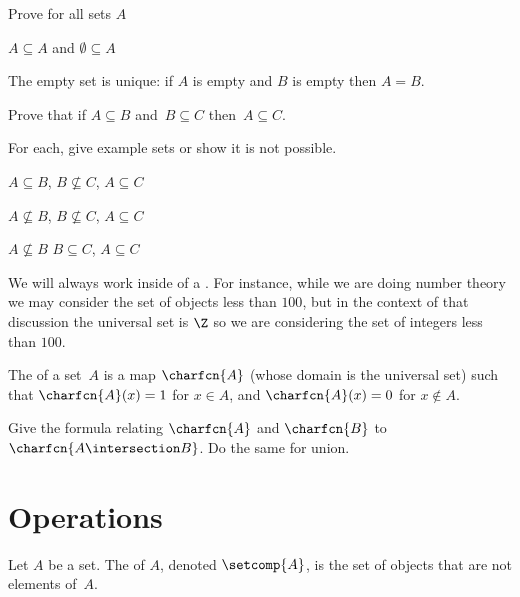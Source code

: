 \documentclass{ibl}
\begin{document}
\begin{ex} Prove for all sets $A$
\begin{exes}
\item $A\subseteq A$ and $\emptyset\subseteq A$
\item The empty set is unique: if $A$ is empty and $B$ is empty then $A=B$.
\end{exes}
\end{ex}

\begin{ex}
Prove that if $A\subseteq B$ and~$B\subseteq C$ then~$A\subseteq C$.  
\end{ex}

\begin{ex} For each, give example sets or show it is not possible.
\begin{exes}
\item $A\subseteq B$, $B\not\subseteq C$, $A\subseteq C$
\item $A\not\subseteq B$, $B\not\subseteq C$, $A\subseteq C$
\item $A\not\subseteq B$ $B\subseteq C$, $A\subseteq C$    
\end{exes}
\end{ex}

We will always work inside of a .
For instance, while we are doing number theory we may consider 
the set of objects less than $100$,
but in the context of that discussion the universal set is $\Z$ 
so we are considering the set of integers less than $100$.

\begin{df}
The  of a set~$A$ is a map
$\charfcn{A}$ (whose domain is the universal set) such that
$\charfcn{A}(x)=1$ for $x\in A$, and $\charfcn{A}(x)=0$ for $x\notin A$.  
\end{df}

\begin{ex}
Give the formula relating $\charfcn{A}$ and $\charfcn{B}$ to
  $\charfcn{A\intersection B}$.
Do the same for union.
\end{ex}





\section{Operations}

\begin{df}
Let $A$ be a set.
The  of $A$, denoted $\setcomp{A}$, is the 
set of objects that are not elements of~$A$.  
\end{df}
\end{document}
